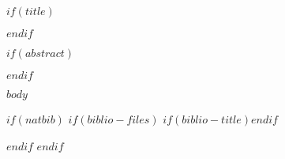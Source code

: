 \documentclass[$if(fontsize)$$fontsize$,$endif$$if(papersize)$$papersize$,$endif$$for(classoption)$$classoption$$sep$,$endfor$]{$documentclass$}
\renewcommand{\refname}{\bfseries{References}}
\begin{document}
\raggedright

$if(title)$\maketitle$endif$
\thispagestyle{empty}

\doublespacing
\linenumbers

$if(abstract)$
\begin{abstract}
\noindent $abstract$

$if(graphicalabstract)$
$endif$

$if(keywords)$
: $for(keywords)$$keywords$$sep$; $endfor$
$endif$
\end{abstract}
$endif$

$body$

$if(natbib)$
$if(biblio-files)$
$if(biblio-title)$\renewcommand\refname{$biblio-title$}$endif$

$endif$
$endif$
\end{document}

